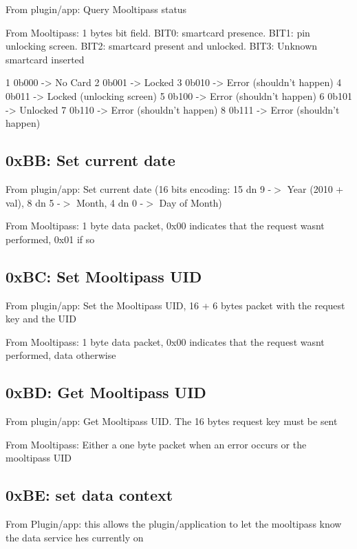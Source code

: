 From plugin/app\+: Query Mooltipass status

From Mooltipass\+: 1 bytes bit field. B\+I\+T0\+: smartcard presence. B\+I\+T1\+: pin unlocking screen. B\+I\+T2\+: smartcard present and unlocked. B\+I\+T3\+: Unknown smartcard inserted


\begin{DoxyCode}
1 0b000 -> No Card
2 0b001 -> Locked
3 0b010 -> Error (shouldn't happen)
4 0b011 -> Locked (unlocking screen)
5 0b100 -> Error (shouldn't happen)
6 0b101 -> Unlocked
7 0b110 -> Error (shouldn't happen)
8 0b111 -> Error (shouldn't happen)
\end{DoxyCode}


\subsection*{0x\+BB\+: Set current date }

From plugin/app\+: Set current date (16 bits encoding\+: 15 dn 9 -\/$>$ Year (2010 + val), 8 dn 5 -\/$>$ Month, 4 dn 0 -\/$>$ Day of Month)

From Mooltipass\+: 1 byte data packet, 0x00 indicates that the request wasn\textquotesingle{}t performed, 0x01 if so

\subsection*{0x\+BC\+: Set Mooltipass U\+ID }

From plugin/app\+: Set the Mooltipass U\+ID, 16 + 6 bytes packet with the request key and the U\+ID

From Mooltipass\+: 1 byte data packet, 0x00 indicates that the request wasn\textquotesingle{}t performed, data otherwise

\subsection*{0x\+BD\+: Get Mooltipass U\+ID }

From plugin/app\+: Get Mooltipass U\+ID. The 16 bytes request key must be sent

From Mooltipass\+: Either a one byte packet when an error occurs or the mooltipass U\+ID

\subsection*{0x\+BE\+: set data context }

From Plugin/app\+: this allows the plugin/application to let the mooltipass know the data service he\textquotesingle{}s currently on

